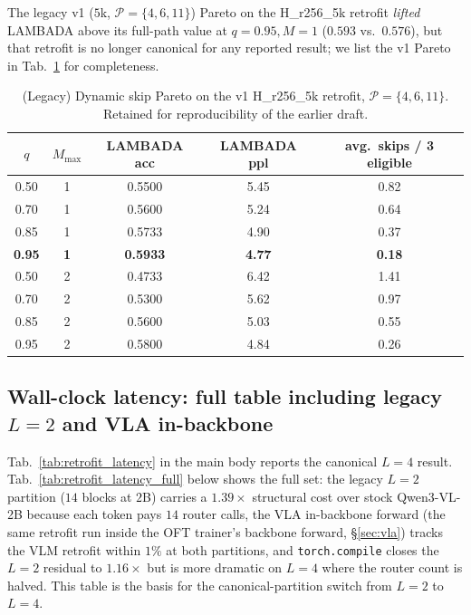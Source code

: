 \documentclass{article}
\begin{document}
The legacy v1 ($5$k, $\mathcal{P}{=}\{4,6,11\}$) Pareto on the H\_r256\_5k retrofit \emph{lifted} LAMBADA above its full-path value at $q{=}0.95, M{=}1$ ($0.593$ vs.\ $0.576$), but that retrofit is no longer canonical for any reported result; we list the v1 Pareto in Tab.~\ref{tab:retrofit_pareto_v1_legacy} for completeness.

\begin{table}[h]
\caption{(Legacy) Dynamic skip Pareto on the v1 H\_r256\_5k retrofit, $\mathcal{P}{=}\{4,6,11\}$. Retained for reproducibility of the earlier draft.}
\label{tab:retrofit_pareto_v1_legacy}
\centering\small
\begin{tabular}{ccccc}
\toprule
$q$ & $M_{\max}$ & LAMBADA acc & LAMBADA ppl & avg.\ skips / 3 eligible \\
\midrule
0.50 & 1 & 0.5500 & 5.45 & 0.82 \\
0.70 & 1 & 0.5600 & 5.24 & 0.64 \\
0.85 & 1 & 0.5733 & 4.90 & 0.37 \\
\textbf{0.95} & \textbf{1} & \textbf{0.5933} & \textbf{4.77} & \textbf{0.18} \\
0.50 & 2 & 0.4733 & 6.42 & 1.41 \\
0.70 & 2 & 0.5300 & 5.62 & 0.97 \\
0.85 & 2 & 0.5600 & 5.03 & 0.55 \\
0.95 & 2 & 0.5800 & 4.84 & 0.26 \\
\bottomrule
\end{tabular}
\end{table}

\subsection{Wall-clock latency: full table including legacy $L{=}2$ and VLA in-backbone}
\label{app:latency}
Tab.~\ref{tab:retrofit_latency} in the main body reports the canonical $L{=}4$ result. Tab.~\ref{tab:retrofit_latency_full} below shows the full set: the legacy $L{=}2$ partition ($14$ blocks at $2$B) carries a $1.39\times$ structural cost over stock Qwen3-VL-2B because each token pays $14$ router calls, the VLA in-backbone forward (the same retrofit run inside the OFT trainer's backbone forward, \S\ref{sec:vla}) tracks the VLM retrofit within $1\%$ at both partitions, and \texttt{torch.compile} closes the $L{=}2$ residual to $1.16\times$ but is more dramatic on $L{=}4$ where the router count is halved. This table is the basis for the canonical-partition switch from $L{=}2$ to $L{=}4$.
\end{document}
